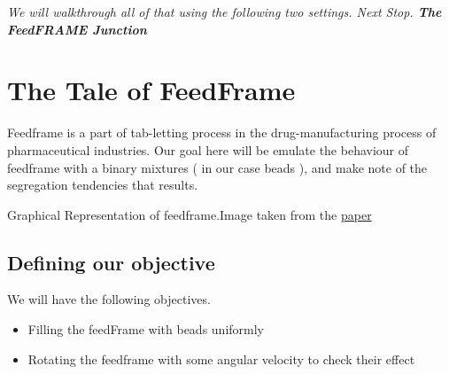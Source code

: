 \documentclass{tufte-book} %
\begin{document}
\textit{We will walkthrough all of that using the following two settings. Next Stop. \textbf{The FeedFRAME Junction} }

\section{The Tale of FeedFrame}
Feedframe is a part of tab-letting process in the drug-manufacturing process of pharmaceutical industries. Our goal here will be emulate the behaviour of feedframe with a binary mixtures ( in our case beads ), and make note of the segregation tendencies that results.

   \begin{marginfigure}
   \caption{Graphical Representation of feedframe.Image taken from the \href{http://www.americanpharmaceuticalreview.com/Featured-Articles/116357-Sample-Presentation-in-Rotary-Tablet-Press-Feed-Frame-Monitoring-by-Near-Infrared-Spectroscopy/}{paper} }
 \end{marginfigure}

\subsection{Defining our objective}

We will have the following objectives.
\begin{itemize}
\item Filling the feedFrame with beads uniformly
\item Rotating the feedframe with some angular velocity to check their effect
\end{itemize}
\end{document}
